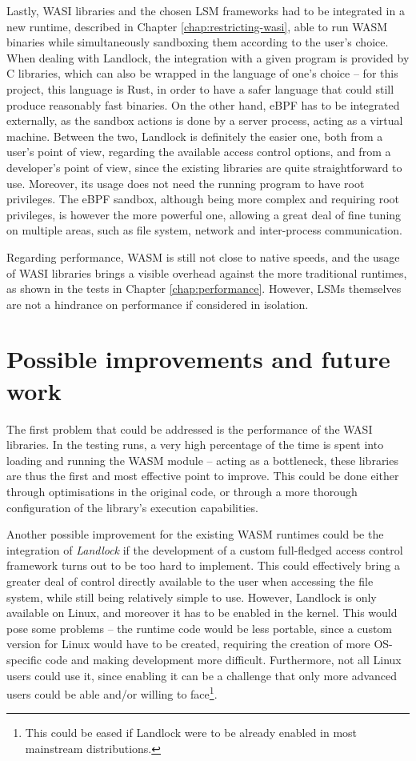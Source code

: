 Lastly, WASI libraries and the chosen LSM frameworks had to be integrated in a new runtime, described in
Chapter \ref{chap:restricting-wasi}, able to run WASM binaries while simultaneously sandboxing them according to the user's choice.
When dealing with Landlock, the integration with a given program is provided by C libraries,
which can also be wrapped in the language of one's choice -- for this project, this language is Rust,
in order to have a safer language that could still produce reasonably fast binaries.
On the other hand, eBPF has to be integrated externally, as the sandbox actions is done by
a server process, acting as a virtual machine.
Between the two, Landlock is definitely the easier one, both from a user's point of view,
regarding the available access control options, and from a developer's point of view, since
the existing libraries are quite straightforward to use. Moreover, its usage does not need the running program
to have root privileges.
The eBPF sandbox, although being more complex and requiring root privileges, is however
the more powerful one, allowing a great deal of fine tuning on multiple areas,
such as file system, network and inter-process communication.

Regarding performance, WASM is still not close to native speeds, and the usage of WASI libraries
brings a visible overhead against the more traditional runtimes, as shown in the tests in Chapter \ref{chap:performance}.
However, LSMs themselves are not a hindrance on performance if considered in isolation.

\section{Possible improvements and future work}

The first problem that could be addressed is the performance of the WASI libraries.
In the testing runs, a very high percentage of the time is spent into loading and running the WASM module --
acting as a bottleneck, these libraries are thus the first and most effective point to improve.
This could be done either through optimisations in the original code, or through a more thorough
configuration of the library's execution capabilities.

Another possible improvement for the existing WASM runtimes could be the integration of \textit{Landlock}
if the development of a custom full-fledged access control framework turns out to be too hard to implement.
This could effectively bring a greater deal of control directly available to the user when
accessing the file system, while still being relatively simple to use.
However, Landlock is only available on Linux, and moreover it has to be enabled in the kernel.
This would pose some problems -- the runtime code would be less portable,
since a custom version for Linux would have to be created, requiring
the creation of more OS-specific code and making development more difficult.
Furthermore, not all Linux users could use it, since enabling it can be a challenge that only more advanced users
could be able and/or willing to face\footnote{This could be eased if Landlock were to be already enabled in most mainstream distributions.}.
